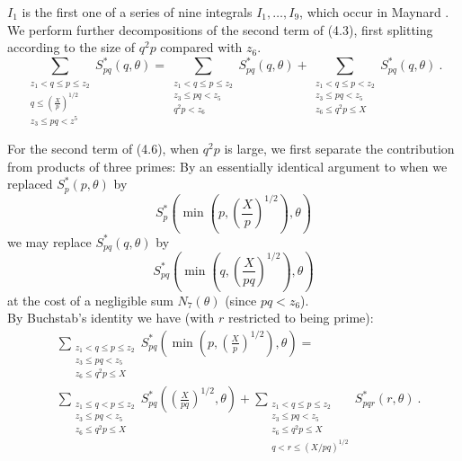 \documentclass{amsart}
\numberwithin{equation}{subsection}
\begin{document}
$I_1$ is the first one of  a series of nine integrals $I_1, \ldots, I_9$, which occur in Maynard \cite{maynard}.\\
We perform further decompositions of the second term of (4.3), first splitting according to the size of $q^2p$ compared with $z_6$.
\[
\sum_{\substack{z_1<q\leq p\leq z_2 \\ q\leq \left(\frac{X}{p}\right)^{1/2} \\ z_3\leq pq< z^5}} S_{pq}^*(q, \theta)= \sum_{\substack{z_1<q\leq p\leq z_2 \\ z_3\leq pq< z_5 \\ q^2p<z_6}} S_{pq}^*(q, \theta) +  \sum_{\substack{z_1<q\leq p< z_2 \\ z_3\leq pq< z_5 \\ z_6\leq q^2p\leq X}} S_{pq}^*(q, \theta) \:. \tag{4.6}
\]

For the second term of (4.6), when $q^2p$ is large, we first separate the contribution from products of three primes: By an essentially identical argument to when we replaced $S_p^*(p, \theta)$ by 
$$S_p^*\left( \min\left(p, \left(\frac{X}{p}\right)^{1/2}\right), \theta\right)$$
we may replace $S_{pq}^*(q, \theta)$ by 
$$S_{pq}^*\left( \min\left(q, \left(\frac{X}{pq}\right)^{1/2}\right), \theta\right)$$
at the cost of a negligible sum $N_7(\theta)$ (since $pq<z_6$).\\
By Buchstab's identity  we have (with $r$ restricted to being prime):
\begin{align*}
&\sum_{\substack{z_1<q\leq p\leq z_2 \\ z_3\leq pq<z_5 \\ z_6\leq q^2p\leq  X}} S_{pq}^*\left( \min\left(p, \left(\frac{X}{p}\right)^{1/2}\right), \theta\right)=\\ 
&\sum_{\substack{z_1\leq q< p\leq z_2 \\ z_3\leq pq<z_5 \\ z_6\leq q^2p\leq  X}} S_{pq}^*\left(  \left(\frac{X}{pq}\right)^{1/2}, \theta\right)
+
\sum_{\substack{z_1<q\leq p\leq z_2 \\ z_3\leq pq<z_5 \\ z_6\leq q^2p\leq  X \\ q<r\leq (X/pq)^{1/2}}} S_{pqr}^*\left(r, \theta\right)\:.
\end{align*} 
\end{document}
